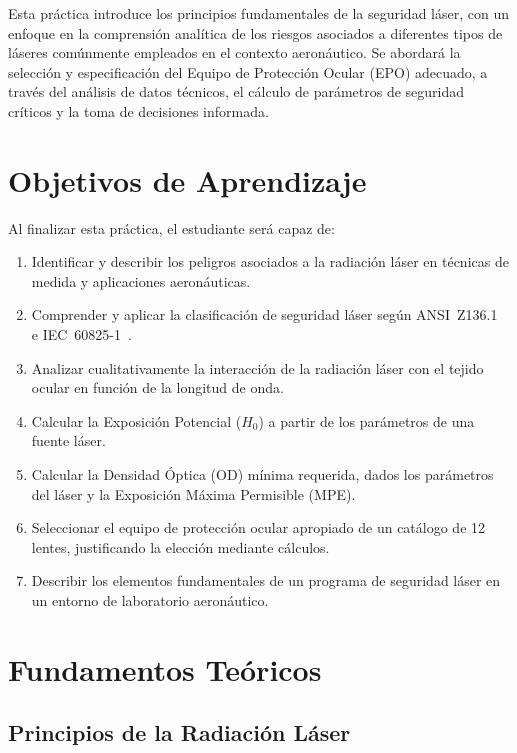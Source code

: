 \documentclass[12pt,a4paper]{article}
\begin{document}
Esta práctica introduce los principios fundamentales de la seguridad láser, con
un enfoque en la comprensión analítica de los riesgos asociados a diferentes
tipos de láseres comúnmente empleados en el contexto aeronáutico. Se abordará
la selección y especificación del Equipo de Protección Ocular (EPO) adecuado,
a través del análisis de datos técnicos, el cálculo de parámetros de seguridad
críticos y la toma de decisiones informada.

\section{Objetivos de Aprendizaje}
\label{sec:objetivos}

Al finalizar esta práctica, el estudiante será capaz de:
\begin{enumerate}
	\item Identificar y describir los peligros asociados a la radiación láser en
	      técnicas de medida y aplicaciones aeronáuticas.
	\item Comprender y aplicar la clasificación de seguridad láser según
	      ANSI~Z136.1~\cite{ansi2014} e IEC~60825-1~\cite{iec60825}.
	\item Analizar cualitativamente la interacción de la radiación láser con el
	      tejido ocular en función de la longitud de onda.
	\item Calcular la Exposición Potencial ($H_0$) a partir de los parámetros
	      de una fuente láser.
	\item Calcular la Densidad Óptica (OD) mínima requerida, dados los
	      parámetros del láser y la Exposición Máxima Permisible (MPE).
	\item Seleccionar el equipo de protección ocular apropiado de un catálogo
	      de 12 lentes, justificando la elección mediante cálculos.
	\item Describir los elementos fundamentales de un programa de seguridad
	      láser en un entorno de laboratorio aeronáutico.
\end{enumerate}

\section{Fundamentos Teóricos}
\label{sec:teoria}

\subsection{Principios de la Radiación Láser}
\end{document}
